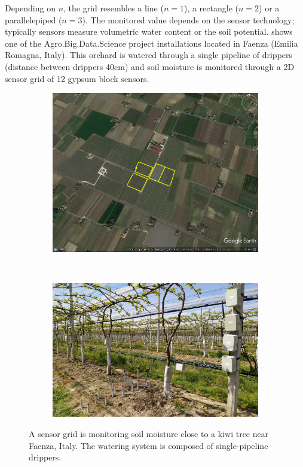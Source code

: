 Depending on $n$, the grid resembles a line ($n=1$), a rectangle ($n=2$) or a parallelepiped ($n=3$). The monitored value depends on the sensor technology; typically sensors measure volumetric water content or the soil potential.  shows one of the Agro.Big.Data.Science project installations \cite{ABDS} located in Faenza (Emilia Romagna, Italy). 
This orchard is watered through a single pipeline of drippers (distance between drippers 40cm) and soil moisture is monitored through a 2D sensor grid of 12 gypsum block sensors.

\begin{figure}[t]
    \centering
    \begin{subfigure}[t]{.5\textwidth}
    \centering
    \includegraphics[scale=.145]{chapters/physics-aware/pluto/img/sensors-satellite.png}
    \end{subfigure}~
    \begin{subfigure}[t]{.5\textwidth}
    \centering
    \includegraphics[scale=.4]{chapters/physics-aware/pluto/img/sensors.jpg}
    \end{subfigure}    
    \caption{A sensor grid is monitoring soil moisture close to a kiwi tree near Faenza, Italy. The watering system is composed of single-pipeline drippers.}
    \label{pluto-fig:installation}
\end{figure}

